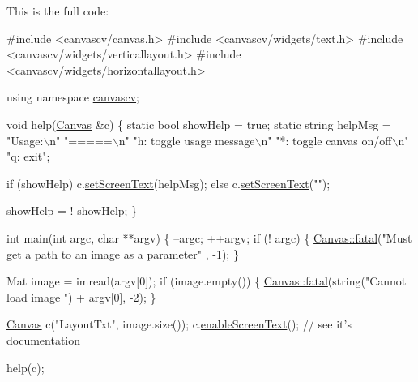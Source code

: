 This is the full code\+: 
\begin{DoxyCode}
\textcolor{preprocessor}{#include <canvascv/canvas.h>}
\textcolor{preprocessor}{#include <canvascv/widgets/text.h>}
\textcolor{preprocessor}{#include <canvascv/widgets/verticallayout.h>}
\textcolor{preprocessor}{#include <canvascv/widgets/horizontallayout.h>}

\textcolor{keyword}{using namespace }\hyperlink{namespacecanvascv}{canvascv};

\textcolor{keywordtype}{void} help(\hyperlink{classcanvascv_1_1Canvas}{Canvas} &c)
\{
    \textcolor{keyword}{static} \textcolor{keywordtype}{bool} showHelp = \textcolor{keyword}{true};
    \textcolor{keyword}{static} \textcolor{keywordtype}{string} helpMsg =
            \textcolor{stringliteral}{"Usage:\(\backslash\)n"}
            \textcolor{stringliteral}{"=====\(\backslash\)n"}
            \textcolor{stringliteral}{"h: toggle usage message\(\backslash\)n"}
            \textcolor{stringliteral}{"*: toggle canvas on/off\(\backslash\)n"}
            \textcolor{stringliteral}{"q: exit"};


    \textcolor{keywordflow}{if} (showHelp) c.\hyperlink{classcanvascv_1_1Canvas_aaedea276b82a8a4cfc0895ae81113cfd}{setScreenText}(helpMsg);
    \textcolor{keywordflow}{else} c.\hyperlink{classcanvascv_1_1Canvas_aaedea276b82a8a4cfc0895ae81113cfd}{setScreenText}(\textcolor{stringliteral}{""});

    showHelp = ! showHelp;
\}

\textcolor{keywordtype}{int} main(\textcolor{keywordtype}{int} argc, \textcolor{keywordtype}{char} **argv)
\{
    --argc;
    ++argv;
    \textcolor{keywordflow}{if} (! argc)
    \{
        \hyperlink{classcanvascv_1_1Canvas_add93c0d5cc1e9b49f97510952a8a1961}{Canvas::fatal}(\textcolor{stringliteral}{"Must get a path to an image as a parameter"} , -1);
    \}

    Mat image = imread(argv[0]);
    \textcolor{keywordflow}{if} (image.empty())
    \{
        \hyperlink{classcanvascv_1_1Canvas_add93c0d5cc1e9b49f97510952a8a1961}{Canvas::fatal}(\textcolor{keywordtype}{string}(\textcolor{stringliteral}{"Cannot load image "}) + argv[0], -2);
    \}

    \hyperlink{classcanvascv_1_1Canvas}{Canvas} c(\textcolor{stringliteral}{"LayoutTxt"}, image.size());
    c.\hyperlink{classcanvascv_1_1Canvas_ae68d3277e738d349232400b38f0e5f9e}{enableScreenText}(); \textcolor{comment}{// see it's documentation}

    help(c);


\end{DoxyCode}
